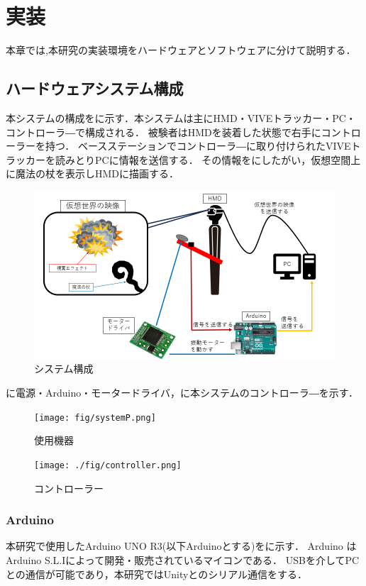 \chapter{実装}
本章では,本研究の実装環境をハードウェアとソフトウェアに分けて説明する．

\section{ハードウェアシステム構成}
本システムの構成をに示す．本システムは主にHMD・VIVEトラッカー・PC・コントローラ―で構成される．
被験者はHMDを装着した状態で右手にコントローラーを持つ．
ベースステーションでコントローラ―に取り付けられたVIVEトラッカーを読みとりPCに情報を送信する．
その情報をにしたがい，仮想空間上に魔法の杖を表示しHMDに描画する．

\begin{figure}[h]
\centering
\includegraphics[clip,width=14cm]{fig/systemhard.png}
\caption{システム構成}\label{sys}
\end{figure}

\newpage

に電源・Arduino・モータードライバ，に本システムのコントローラ―を示す．

\begin{figure}[h]
    \centering
    \texttt{[image: fig/systemP.png]}
    \caption{使用機器}\label{sysP}
    \end{figure}

\begin{figure}[h]
\centering
\texttt{[image: ./fig/controller.png]}
\caption{コントローラー}\label{controller}
\end{figure}

\newpage

\subsection{Arduino}
本研究で使用したArduino UNO R3\cite{arduino}(以下Arduinoとする)をに示す．
Arduino はArduino S.L.Iによって開発・販売されているマイコンである．
USBを介してPCとの通信が可能であり，本研究ではUnityとのシリアル通信をする．

